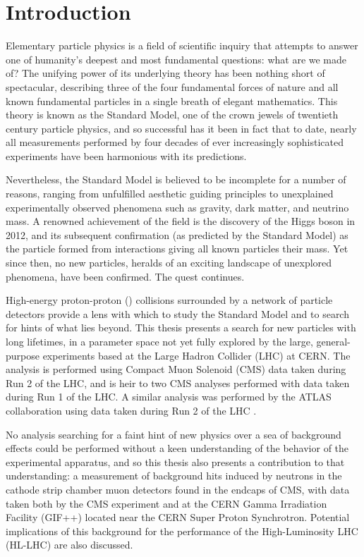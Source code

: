 \chapter{Introduction}

Elementary particle physics is a field of scientific inquiry that attempts to answer one of humanity's deepest and most fundamental questions: what are we made of?
The unifying power of its underlying theory has been nothing short of spectacular, describing three of the four fundamental forces of nature and all known fundamental particles in a single breath of elegant mathematics.
This theory is known as the Standard Model, one of the crown jewels of twentieth century particle physics, and so successful has it been in fact that to date, nearly all measurements performed by four decades of ever increasingly sophisticated experiments have been harmonious with its predictions.

Nevertheless, the Standard Model is believed to be incomplete for a number of reasons, ranging from unfulfilled aesthetic guiding principles to unexplained experimentally observed phenomena such as gravity, dark matter, and neutrino mass.
A renowned achievement of the field is the discovery of the Higgs boson in 2012, and its subsequent confirmation (as predicted by the Standard Model) as the particle formed from interactions giving all known particles their mass.
Yet since then, no new particles, heralds of an exciting landscape of unexplored phenomena, have been confirmed.
The quest continues.

High-energy proton-proton (\pp) collisions surrounded by a network of particle detectors provide a lens with which to study the Standard Model and to search for hints of what lies beyond.
This thesis presents a search for new particles with long lifetimes, in a parameter space not yet fully explored by the large, general-purpose experiments based at the Large Hadron Collider (LHC) at CERN.
The analysis is performed using Compact Muon Solenoid (CMS) data taken during Run 2 of the LHC, and is heir to two CMS analyses \cite{EXO-12-037,CMS-PAS-EXO-14-012} performed with data taken during Run 1 of the LHC.
A similar analysis was performed by the ATLAS collaboration using data taken during Run 2 of the LHC \cite{ATLAS}.

No analysis searching for a faint hint of new physics over a sea of background effects could be performed without a keen understanding of the behavior of the experimental apparatus, and so this thesis also presents a contribution to that understanding: a measurement of background hits induced by neutrons in the cathode strip chamber muon detectors found in the endcaps of CMS, with data taken both by the CMS experiment and at the CERN Gamma Irradiation Facility (GIF++) located near the CERN Super Proton Synchrotron.
Potential implications of this background for the performance of the High-Luminosity LHC (HL-LHC) are also discussed.

